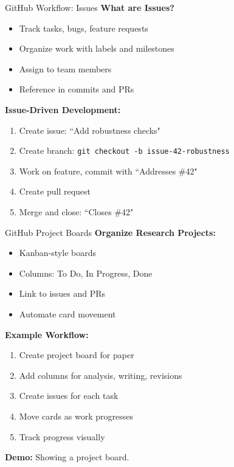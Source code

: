\documentclass[11pt,aspectratio=169]{beamer}
\begin{document}
\begin{frame}{GitHub Workflow: Issues}
\textbf{What are Issues?}
\begin{itemize}
    \item Track tasks, bugs, feature requests
    \item Organize work with labels and milestones
    \item Assign to team members
    \item Reference in commits and PRs
\end{itemize}

\vspace{0.3cm}

\textbf{Issue-Driven Development:}
\begin{enumerate}
    \item Create issue: ``Add robustness checks"
    \item Create branch: \texttt{git checkout -b issue-42-robustness}
    \item Work on feature, commit with ``Addresses \#42"
    \item Create pull request
    \item Merge and close: ``Closes \#42"
\end{enumerate}

\end{frame}


\begin{frame}{GitHub Project Boards}
\textbf{Organize Research Projects:}
\begin{itemize}
    \item Kanban-style boards
    \item Columns: To Do, In Progress, Done
    \item Link to issues and PRs
    \item Automate card movement
\end{itemize}

\vspace{0.3cm}

\textbf{Example Workflow:}
\begin{enumerate}
    \item Create project board for paper
    \item Add columns for analysis, writing, revisions
    \item Create issues for each task
    \item Move cards as work progresses
    \item Track progress visually
\end{enumerate}

\vspace{0.3cm}
\textbf{Demo:} Showing a project board.
\end{frame}
\end{document}

